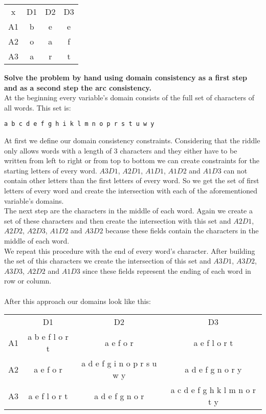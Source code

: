 \documentclass[10pt,a4paper]{article}
\begin{document}
\begin{center}
	\begin{tabular}{ c c c c}
	x & D1 & D2 & D3 \\
	A1 & b & e & e \\ 
	A2 & o & a & f \\  
	A3 & a & r & t    
	\end{tabular}
\end{center}

\newpage

\noindent \textbf{Solve the problem by hand using domain consistency as a first step and as a second step the arc consistency.} \\

\noindent At the beginning every variable's domain consists of the full set of characters of all words. This set is:

\begin{lstlisting}
a b c d e f g h i k l m n o p r s t u w y
\end{lstlisting}

\noindent At first we define our domain consistency constraints. Considering that the riddle only allows words with a length of 3 characters and they either have to be written from left to right or from top to bottom we can create constraints for the starting letters of every word. $A3D1$, $A2D1$, $A1D1$, $A1D2$ and $A1D3$ can not contain other letters than the first letters of every word. So we get the set of first letters of every word and create the intersection with each of the aforementioned variable's domains.
\\
The next step are the characters in the middle of each word. Again we create a set of these characters and then create the intersection with this set and $A2D1$, $A2D2$, $A2D3$, $A1D2$ and $A3D2$ because these fields contain the characters in the middle of each word.
\\
We repeat this procedure with the end of every word's character. After building the set of this characters we create the intersection of this set and $A3D1$, $A3D2$, $A3D3$, $A2D2$ and $A1D3$ since these fields represent the ending of each word in row or column.
\\
\\
After this approach our domains look like this:

\begin{center}
	\begin{tabular}{ c c c c}
	  & D1 & D2 & D3 \\
	A1 & a b e f l o r t & a e f o r & a e f l o r t \\ 
	A2 & a e f o r & a d e f g i n o p r s u w y & a d e f g n o r y \\  
	A3 & a e f l o r t & a d e f g n o r & a c d e f g h k l m n o r t y    
	\end{tabular}
\end{center}
\end{document}
